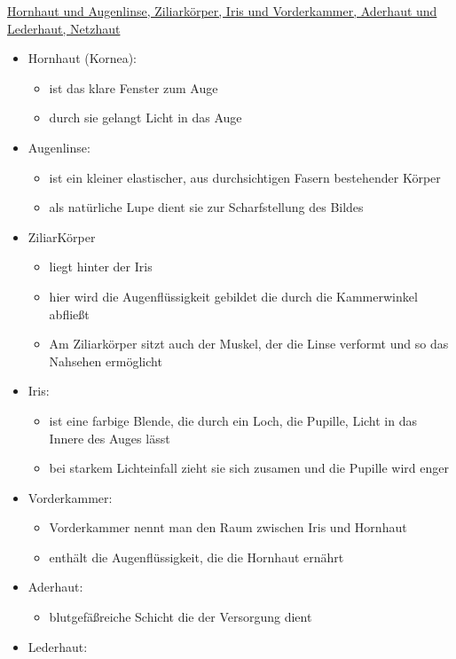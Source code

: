 \documentclass[a4paper,10pt,oneside]{article}
\begin{document}
\underline{Hornhaut und Augenlinse, Ziliarkörper, Iris und Vorderkammer, Aderhaut und Lederhaut, Netzhaut} \\
	\begin{itemize}
		\item Hornhaut (Kornea):
			\begin{itemize}
				\item ist das klare Fenster zum Auge
				\item durch sie gelangt Licht in das Auge
			\end{itemize}
		\item Augenlinse:
			\begin{itemize}
				\item ist ein kleiner elastischer, aus durchsichtigen Fasern bestehender Körper
				\item als natürliche Lupe dient sie zur Scharfstellung des Bildes
			\end{itemize}
		\item ZiliarKörper
			\begin{itemize}
				\item liegt hinter der Iris
				\item hier wird die Augenflüssigkeit gebildet die durch die Kammerwinkel abfließt
				\item Am Ziliarkörper sitzt auch der Muskel, der die Linse verformt und so das Nahsehen ermöglicht
			\end{itemize}
		\item Iris:
			\begin{itemize}
				\item ist eine farbige Blende, die durch ein Loch, die Pupille, Licht in das Innere des Auges lässt 
				\item bei starkem Lichteinfall zieht sie sich zusamen und die Pupille wird enger
			\end{itemize}
		\item Vorderkammer:
			\begin{itemize}
				\item Vorderkammer nennt man den Raum zwischen Iris und Hornhaut
				\item enthält die Augenflüssigkeit, die die Hornhaut ernährt
			\end{itemize}
		\item Aderhaut:
			\begin{itemize}
				\item blutgefäßreiche Schicht die der Versorgung dient
			\end{itemize}
		\item Lederhaut:

\end{itemize}
\end{document}
